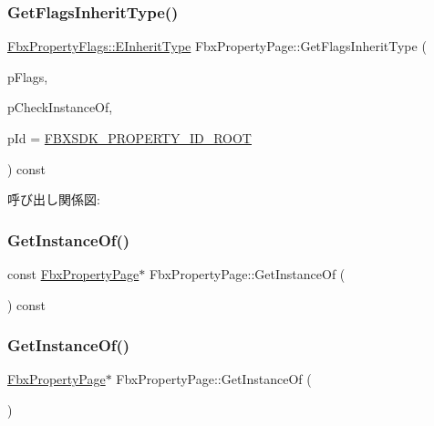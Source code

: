 \subsubsection{\texorpdfstring{Get\+Flags\+Inherit\+Type()}{GetFlagsInheritType()}}
{\footnotesize\ttfamily \hyperlink{class_fbx_property_flags_ae3b667a4fcac4b827fa186a698fec2f8}{Fbx\+Property\+Flags\+::\+E\+Inherit\+Type} Fbx\+Property\+Page\+::\+Get\+Flags\+Inherit\+Type (\begin{DoxyParamCaption}\item[{\hyperlink{class_fbx_property_flags_afabfa7e0949aac8a7dcdf8a141867e99}{Fbx\+Property\+Flags\+::\+E\+Flags}}]{p\+Flags,  }\item[{bool}]{p\+Check\+Instance\+Of,  }\item[{\hyperlink{fbxtypes_8h_a088fa96de3b0b3ea69f0f6afef525dfb}{Fbx\+Int}}]{p\+Id = {\ttfamily \hyperlink{fbxpropertydef_8h_a291bdb6d8428dce8463143fa3aba2c34}{F\+B\+X\+S\+D\+K\+\_\+\+P\+R\+O\+P\+E\+R\+T\+Y\+\_\+\+I\+D\+\_\+\+R\+O\+OT}} }\end{DoxyParamCaption}) const}

呼び出し関係図\+:
\mbox{\label{class_fbx_property_page_ae04ab74504925a3d83ed68bcda0264b8}} 
\subsubsection{\texorpdfstring{Get\+Instance\+Of()}{GetInstanceOf()}\hspace{0.1cm}{\footnotesize\ttfamily [1/2]}}
{\footnotesize\ttfamily const \hyperlink{class_fbx_property_page}{Fbx\+Property\+Page}$\ast$ Fbx\+Property\+Page\+::\+Get\+Instance\+Of (\begin{DoxyParamCaption}{ }\end{DoxyParamCaption}) const}

\mbox{\label{class_fbx_property_page_a16771d13e6e93506f911ad731726a02c}} 
\subsubsection{\texorpdfstring{Get\+Instance\+Of()}{GetInstanceOf()}\hspace{0.1cm}{\footnotesize\ttfamily [2/2]}}
{\footnotesize\ttfamily \hyperlink{class_fbx_property_page}{Fbx\+Property\+Page}$\ast$ Fbx\+Property\+Page\+::\+Get\+Instance\+Of (\begin{DoxyParamCaption}{ }\end{DoxyParamCaption})}

